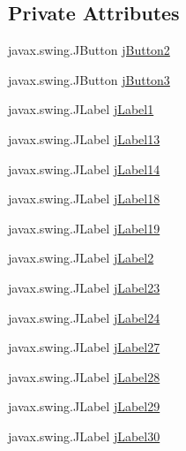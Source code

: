 \subsection*{Private Attributes}
\begin{DoxyCompactItemize}
\item 
javax.\+swing.\+J\+Button \mbox{\hyperlink{classinterfacessoguar_1_1paenrique_a893537fc97884d87f31ed05c28ffa158}{j\+Button2}}
\item 
javax.\+swing.\+J\+Button \mbox{\hyperlink{classinterfacessoguar_1_1paenrique_ac5655995cee95415c5fa0bfd6eb58b49}{j\+Button3}}
\item 
javax.\+swing.\+J\+Label \mbox{\hyperlink{classinterfacessoguar_1_1paenrique_a69df573814db382c28d77ef7064da795}{j\+Label1}}
\item 
javax.\+swing.\+J\+Label \mbox{\hyperlink{classinterfacessoguar_1_1paenrique_a4b950a5b2a126d8b9d9bcb1578605f13}{j\+Label13}}
\item 
javax.\+swing.\+J\+Label \mbox{\hyperlink{classinterfacessoguar_1_1paenrique_a3155f4aea6f0a87b75cb71152763fe4a}{j\+Label14}}
\item 
javax.\+swing.\+J\+Label \mbox{\hyperlink{classinterfacessoguar_1_1paenrique_a81a2ccdeb485bf8ec4bdc5f952b83e21}{j\+Label18}}
\item 
javax.\+swing.\+J\+Label \mbox{\hyperlink{classinterfacessoguar_1_1paenrique_ab4f7d75f1e894ee3d7f89612ca7f300c}{j\+Label19}}
\item 
javax.\+swing.\+J\+Label \mbox{\hyperlink{classinterfacessoguar_1_1paenrique_a213ee92d0638dee5a178c9c6fcc5befc}{j\+Label2}}
\item 
javax.\+swing.\+J\+Label \mbox{\hyperlink{classinterfacessoguar_1_1paenrique_a925293df4e0f65ac4b51ef429935f333}{j\+Label23}}
\item 
javax.\+swing.\+J\+Label \mbox{\hyperlink{classinterfacessoguar_1_1paenrique_a2ac7ac55fe97038c90f1e66dd1af19d0}{j\+Label24}}
\item 
javax.\+swing.\+J\+Label \mbox{\hyperlink{classinterfacessoguar_1_1paenrique_a2f3f435766dfa8d25ce72db778454f41}{j\+Label27}}
\item 
javax.\+swing.\+J\+Label \mbox{\hyperlink{classinterfacessoguar_1_1paenrique_ac87555268164c8333fa21ca04c5cb402}{j\+Label28}}
\item 
javax.\+swing.\+J\+Label \mbox{\hyperlink{classinterfacessoguar_1_1paenrique_acb0b1be4c242fe2664aef099461f11b3}{j\+Label29}}
\item 
javax.\+swing.\+J\+Label \mbox{\hyperlink{classinterfacessoguar_1_1paenrique_a592d4e690f30eaa5c1c7626271d513f2}{j\+Label30}}

\end{DoxyCompactItemize}
